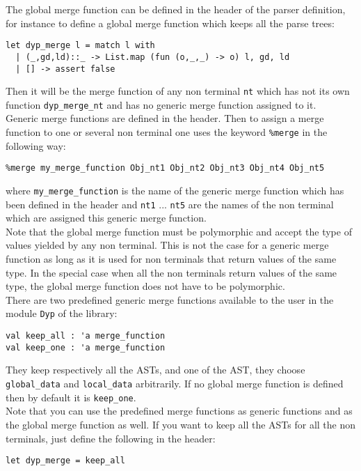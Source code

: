 \documentclass[12pt]{article}
\begin{document}
{The global merge function can be defined in the header of the parser definition, for instance to define a global merge function which keeps all the parse trees:
\begin{verbatim}
let dyp_merge l = match l with
  | (_,gd,ld)::_ -> List.map (fun (o,_,_) -> o) l, gd, ld
  | [] -> assert false
\end{verbatim}
Then it will be the merge function of any non terminal \texttt{nt} which has not its own function \verb|dyp_merge_nt| and has no generic merge function assigned to it.\\

Generic merge functions are defined in the header. Then to assign a merge function to one or several non terminal one uses the keyword \verb|%merge| in the following way:
\begin{verbatim}
%merge my_merge_function Obj_nt1 Obj_nt2 Obj_nt3 Obj_nt4 Obj_nt5
\end{verbatim}
where \verb|my_merge_function| is the name of the generic merge function which has been defined in the header and \verb|nt1| ... \verb|nt5| are the names of the non terminal which are assigned this generic merge function.\\

Note that the global merge function must be polymorphic and accept the type of values yielded by any non terminal. This is not the case for a generic merge function as long as it is used for non terminals that return values of the same type. In the special case when all the non terminals return values of the same type, the global merge function does not have to be polymorphic.\\

There are two predefined generic merge functions available to the user in the module \verb|Dyp| of the library:
\begin{verbatim}
val keep_all : 'a merge_function
val keep_one : 'a merge_function
\end{verbatim}
They keep respectively all the ASTs, and one of the AST, they choose \verb|global_data| and \verb|local_data| arbitrarily. If no global merge function is defined then by default it is \verb|keep_one|.\\

Note that you can use the predefined merge functions as generic functions and as the global merge function as well. If you want to keep all the ASTs for all the non terminals, just define the following in the header:
\begin{verbatim}
let dyp_merge = keep_all
\end{verbatim}

}
\end{document}
